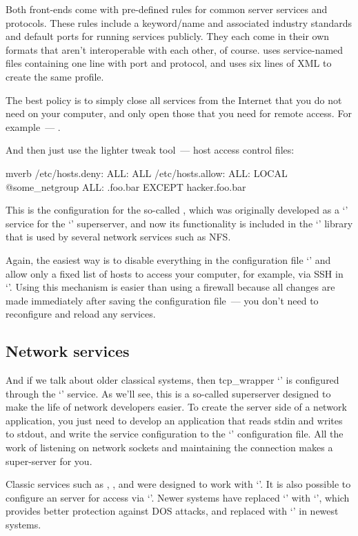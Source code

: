 Both front-ends come with pre-defined rules for common server services and
protocols. These rules include a keyword/name and associated industry standards
and default ports for running services publicly. They each come in their own
formats that aren’t interoperable with each other, of course.  uses
service-named files containing one line with port and protocol, and
 uses six lines of XML to create the same profile.

The best policy is to simply close all services from the Internet that
you do not need on your computer, and only open those that you need
for remote access. For example~--- .

And then just use the lighter tweak tool~--- host access control files:
\begin{code}{mverb}
/etc/hosts.deny:
          ALL: ALL
/etc/hosts.allow:
          ALL: LOCAL @some_netgroup
          ALL: .foo.bar EXCEPT hacker.foo.bar
\end{code}
This is the configuration for the so-called , which was
originally developed as a `' service for the `' superserver,
and now its functionality is included in the `' library
that is used by several network services such as NFS.

Again, the easiest way is to disable everything in the configuration file
`' and allow only a fixed list of hosts to access your
computer, for example, via SSH in `'. Using this
mechanism is easier than using a firewall because all changes are made
immediately after saving the configuration file~--- you don't need to
reconfigure and reload any services.

\subsection*{Network services} %

And if we talk about older classical systems, then tcp\_wrapper `' is
configured through the `' service. As we'll see, this is a so-called
superserver designed to make the life of network developers easier. To create
the server side of a network application, you just need to develop
an application that reads stdin and writes to stdout, and write the service
configuration to the `' configuration file. All the work of
listening on network sockets and maintaining the connection makes
a super-server for you.

Classic services such as , , and  were
designed to work with `'. It is also possible to configure
an  server for access via `'. Newer systems have
replaced `' with `', which provides better protection
against DOS attacks, and replaced with `' in newest systems.
